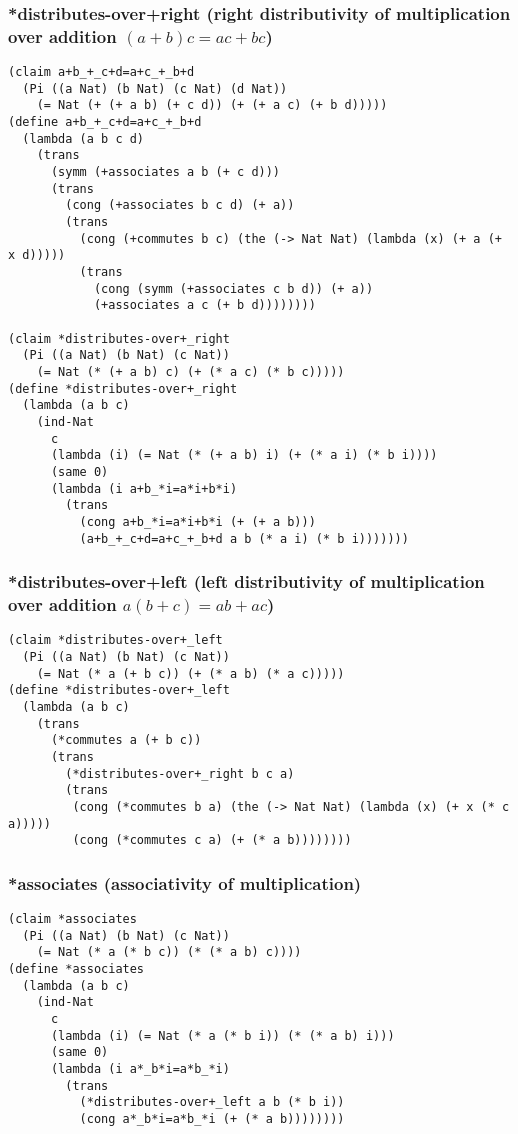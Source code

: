 \subsubsection{*distributes-over+right (right distributivity of multiplication over addition \((a + b)c = ac + bc\))} \label{code:*distributes-over+right}
\begin{lstlisting}
(claim a+b_+_c+d=a+c_+_b+d
  (Pi ((a Nat) (b Nat) (c Nat) (d Nat))
    (= Nat (+ (+ a b) (+ c d)) (+ (+ a c) (+ b d)))))
(define a+b_+_c+d=a+c_+_b+d
  (lambda (a b c d)
    (trans
      (symm (+associates a b (+ c d)))
      (trans
        (cong (+associates b c d) (+ a))
        (trans
          (cong (+commutes b c) (the (-> Nat Nat) (lambda (x) (+ a (+ x d)))))
          (trans
            (cong (symm (+associates c b d)) (+ a))
            (+associates a c (+ b d))))))))

(claim *distributes-over+_right
  (Pi ((a Nat) (b Nat) (c Nat))
    (= Nat (* (+ a b) c) (+ (* a c) (* b c)))))
(define *distributes-over+_right
  (lambda (a b c)
    (ind-Nat
      c
      (lambda (i) (= Nat (* (+ a b) i) (+ (* a i) (* b i))))
      (same 0)
      (lambda (i a+b_*i=a*i+b*i)
        (trans
          (cong a+b_*i=a*i+b*i (+ (+ a b)))
          (a+b_+_c+d=a+c_+_b+d a b (* a i) (* b i)))))))
\end{lstlisting}

\subsubsection{*distributes-over+left (left distributivity of multiplication over addition \(a(b + c) = ab + ac\))} \label{code:*distributes-over+left}
\begin{lstlisting}
(claim *distributes-over+_left
  (Pi ((a Nat) (b Nat) (c Nat))
    (= Nat (* a (+ b c)) (+ (* a b) (* a c)))))
(define *distributes-over+_left
  (lambda (a b c)
    (trans
      (*commutes a (+ b c))
      (trans
        (*distributes-over+_right b c a)
        (trans
         (cong (*commutes b a) (the (-> Nat Nat) (lambda (x) (+ x (* c a)))))
         (cong (*commutes c a) (+ (* a b))))))))
\end{lstlisting}

\subsubsection{*associates (associativity of multiplication)} \label{code:*associates}
\begin{lstlisting}
(claim *associates
  (Pi ((a Nat) (b Nat) (c Nat))
    (= Nat (* a (* b c)) (* (* a b) c))))
(define *associates
  (lambda (a b c)
    (ind-Nat
      c
      (lambda (i) (= Nat (* a (* b i)) (* (* a b) i)))
      (same 0)
      (lambda (i a*_b*i=a*b_*i)
        (trans
          (*distributes-over+_left a b (* b i))
          (cong a*_b*i=a*b_*i (+ (* a b))))))))
\end{lstlisting}

